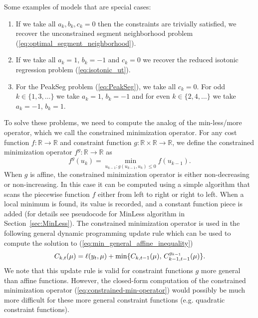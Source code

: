 \documentclass{article}
\newcommand{\RR}{\mathbb R}
\begin{document}
Some examples of models that are special cases:
\begin{enumerate}
\item If we take all $a_k,b_k,c_k=0$ then the constraints are
  trivially satisfied, we
  recover the unconstrained segment neighborhood problem
  (\ref{eq:optimal_segment_neighborhood}).
\item If we take all $a_{k} =1$, $b_{k}=-1$ and $c_{k} = 0$ we recover
  the reduced isotonic regression problem
  (\ref{eq:isotonic_ut}).
\item For the PeakSeg problem (\ref{eq:PeakSeg}),
  we take all $c_{k} = 0$. For odd $k\in\{1,3,\dots\}$ we take
  $a_{k} =1$, $b_{k}=-1$ and for even $k\in\{2,4,\dots\}$ we take
  $a_{k} =-1$, $b_{k}=1$.
\end{enumerate}
To solve these problems, we need to compute the analog of the
min-less/more operator, which we call the constrained minimization
operator. For any cost function $f:\RR\rightarrow\RR$ and constraint
function $g:\RR\times\RR\rightarrow\RR$, we define the constrained
minimization operator $f^g:\RR\rightarrow\RR$ as
\begin{equation}
  \label{eq:constrained-min-operator}
  f^g(u_{k}) = \min_{u_{k-1} : g(u_{k-1}, u_{k})\leq 0} f(u_{k-1}).
\end{equation}
When $g$ is affine, the constrained minimization operator is either
non-decreasing or non-increasing. In this case it can be computed
using a simple algorithm that scans the piecewise function $f$ either
from left to right or right to left. When a local minimum is found,
its value is recorded, and a constant function piece is added (for
details see pseudocode for MinLess algorithm in
Section~\ref{sec:MinLess}). The constrained minimization operator is
used in the following general dynamic programming update rule which
can be used to compute the solution to
(\ref{eq:min_general_affine_inequality})
\begin{equation}
  \label{eq:general_dp}
  C_{k,t}(\mu) = \ell(y_t,\mu) + \min\{
  C_{k,t-1}(\mu),\,
  C_{k-1,t-1}^{g_{k-1}}(\mu)
  \}.
\end{equation}
We note that this update rule is valid for constraint functions $g$
more general than affine functions. However, the
closed-form computation of the constrained minimization operator
(\ref{eq:constrained-min-operator}) would possibly be much more
difficult for these more general constraint functions (e.g. quadratic
constraint functions).
\end{document}
